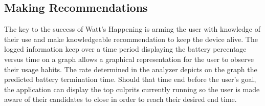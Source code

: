 \subsection*{Making Recommendations}
The key to the success of Watt's Happening is arming the user with knowledge of their use and make knowledgeable recommendation to keep the device alive.  
The logged information keep over a time period displaying the battery percentage versus time on a graph allows a graphical representation for the user to observe their usage habits. 
The rate determined in the analyzer depicts on the graph the predicted battery termination time.  
Should that time end before the user's goal, the application can display the top culprits currently running so the user is made aware of their candidates to close in order to reach their desired end time.

